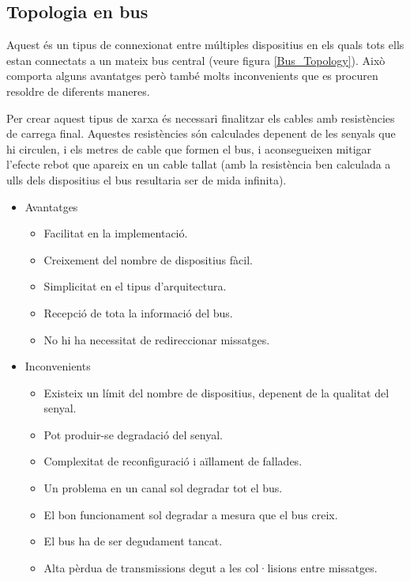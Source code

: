 \subsection{Topologia en bus}\label{cap:tec:prot:bus}

Aquest és un tipus de connexionat entre múltiples dispositius en els quals tots ells estan connectats a un mateix bus central (veure figura \ref{Bus_Topology}). Això comporta alguns avantatges però també molts inconvenients que es procuren resoldre de diferents maneres.

Per crear aquest tipus de xarxa és necessari finalitzar els cables amb resistències de carrega final. Aquestes resistències són calculades depenent de les senyals que hi circulen, i els metres de cable que formen el bus, i aconsegueixen mitigar l'efecte rebot que apareix en un cable tallat (amb la resistència ben calculada a ulls dels dispositius el bus resultaria ser de mida infinita).

\begin{itemize}
	\item Avantatges
		\begin{itemize}
			\item Facilitat en la implementació.
			\item Creixement del nombre de dispositius fàcil.
			\item Simplicitat en el tipus d'arquitectura.
			\item Recepció de tota la informació del bus.
			\item No hi ha necessitat de redireccionar missatges.
		\end{itemize}
	\item Inconvenients
		\begin{itemize}
			\item Existeix un  límit del nombre de dispositius, depenent de la qualitat del senyal.
			\item Pot produir-se degradació del senyal.
			\item Complexitat de reconfiguració i aïllament de fallades.
			\item Un problema en un canal sol degradar tot el bus.
			\item El bon funcionament sol degradar a mesura que el bus creix.
			\item El bus ha de ser degudament tancat.
			\item Alta pèrdua de transmissions degut a les col·lisions entre missatges.
		\end{itemize}
\end{itemize}

